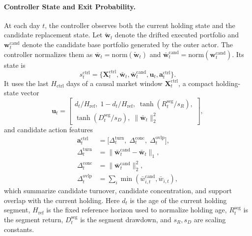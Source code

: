 \documentclass[letterpaper]{article} %
\begin{document}
\paragraph{Controller State and Exit Probability.}
At each day \(t\), the controller observes both the current holding state and the candidate replacement state. Let \(\tilde{\mathbf{w}}_t\) denote the drifted executed portfolio and \(\mathbf{w}_t^{\mathrm{cand}}\) denote the candidate base portfolio generated by the outer actor. The controller normalizes them as \(\bar{\mathbf{w}}_t=\mathrm{norm}(\tilde{\mathbf{w}}_t)\) and \(\bar{\mathbf{w}}_t^{\mathrm{cand}}=\mathrm{norm}(\mathbf{w}_t^{\mathrm{cand}})\). Its state is
\[
s_t^{\mathrm{ctrl}}
=
\{\mathbf{X}_t^{\mathrm{ctrl}},\bar{\mathbf{w}}_t,\bar{\mathbf{w}}_t^{\mathrm{cand}},\mathbf{u}_t,\mathbf{a}_t^{\mathrm{ctrl}}\}.
\]
It uses the last \(H_{\mathrm{ctrl}}\) days of a causal market window \(\mathbf{X}_{t}^{\mathrm{ctrl}}\), a compact holding-state vector
\[
\mathbf{u}_t
=
\begin{bmatrix}
d_t/H_{\mathrm{ref}},\;1-d_t/H_{\mathrm{ref}},\;
\tanh(R_t^{\mathrm{seg}}/s_R),\\
\tanh(D_t^{\mathrm{seg}}/s_D),\;
\|\bar{\mathbf{w}}_t\|_2^2
\end{bmatrix},
\]
and candidate action features
\[
\begin{aligned}
\mathbf{a}^{\mathrm{ctrl}}_t
&=
\bigl[
\Delta_t^{\mathrm{turn}},\;
\Delta_t^{\mathrm{conc}},\;
\Delta_t^{\mathrm{ovlp}}
\bigr],\\
\Delta_t^{\mathrm{turn}}
&=\|\bar{\mathbf{w}}_t^{\mathrm{cand}}-\bar{\mathbf{w}}_t\|_1,\\
\Delta_t^{\mathrm{conc}}
&=\|\bar{\mathbf{w}}_t^{\mathrm{cand}}\|_2^2,\\
\Delta_t^{\mathrm{ovlp}}
&=\sum_i \min(\bar{w}_{i,t}^{\mathrm{cand}},\bar{w}_{i,t}),
\end{aligned}
\]
which summarize candidate turnover, candidate concentration, and support overlap with the current holding. Here \(d_t\) is the age of the current holding segment, \(H_{\mathrm{ref}}\) is the fixed reference horizon used to normalize holding age, \(R_t^{\mathrm{seg}}\) is the segment return, \(D_t^{\mathrm{seg}}\) is the segment drawdown, and \(s_R,s_D\) are scaling constants.
\end{document}

